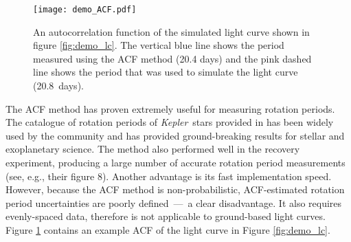 \documentclass[a4paper,fleqn,usenatbib,useAMS]{mnras}
\newcommand{\Kepler}{{\it Kepler}}
\newcommand{\aigrainexampleperiod}{20.8}
\begin{document}
\begin{figure}
\begin{center}
\texttt{[image: demo\_ACF.pdf]}
\caption[ACF of a simulated light curve.]
{An autocorrelation function of the simulated light curve shown in figure
\ref{fig:demo_lc}.
The vertical blue line shows the period measured using the ACF method (20.4
days) and the pink dashed line shows the period that was used to simulate the
light curve (\aigrainexampleperiod\ days).}
\label{fig:demo_acf}
\end{center}
\end{figure}

The ACF method has proven extremely useful for measuring rotation periods.
The catalogue of rotation periods of \Kepler\ stars provided in
\citet{Mcquillan2013} has been widely used by the community and has provided
ground-breaking results for stellar and exoplanetary science.
The method also performed well in the \citet{Aigrain2015}
recovery experiment,
producing a large number of accurate rotation period measurements
(see, e.g., their figure 8).
Another advantage is its fast implementation speed.
However, because the ACF method is non-probabilistic, ACF-estimated rotation
period uncertainties are poorly defined~---~a clear disadvantage.
It also requires evenly-spaced data, therefore is not applicable to
ground-based light curves.
Figure \ref{fig:demo_acf} contains an example ACF of the light curve in
Figure \ref{fig:demo_lc}.
\end{document}
